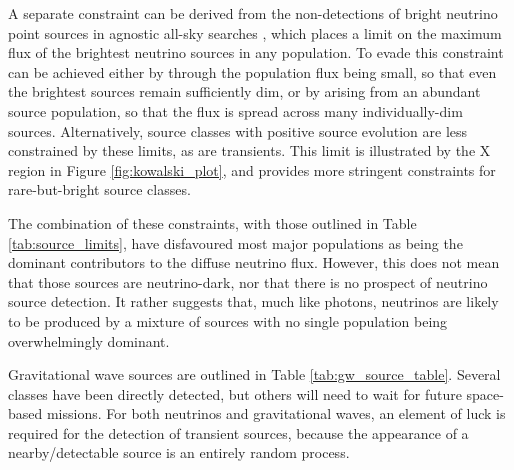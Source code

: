 A separate constraint can be derived from the non-detections of bright neutrino point sources in agnostic all-sky searches \cite{ic_ps_10_yr}, which places a limit on the maximum flux of the brightest neutrino sources in any population. To evade this constraint can be achieved either by through the population flux being small, so that even the brightest sources remain sufficiently dim, or by arising from an abundant source population, so that the flux is spread across many individually-dim sources. Alternatively, source classes with positive source evolution are less constrained by these limits, as are transients. This limit is illustrated by the X region in Figure \ref{fig:kowalski_plot}, and provides more stringent constraints for rare-but-bright source classes.

The combination of these constraints, with those outlined in Table \ref{tab:source_limits}, have disfavoured most major populations as being the dominant contributors to the diffuse neutrino flux. However, this does not mean that those sources are neutrino-dark, nor that there is no prospect of neutrino source detection. It rather suggests that, much like photons, neutrinos are likely to be produced by a mixture of sources with no single population being overwhelmingly dominant. 

Gravitational wave sources are outlined in Table \ref{tab:gw_source_table}. Several classes have been directly detected, but others will need to wait for future space-based missions. For both neutrinos and gravitational waves, an element of luck is required for the detection of transient sources, because the appearance of a nearby/detectable source is an entirely random process.

